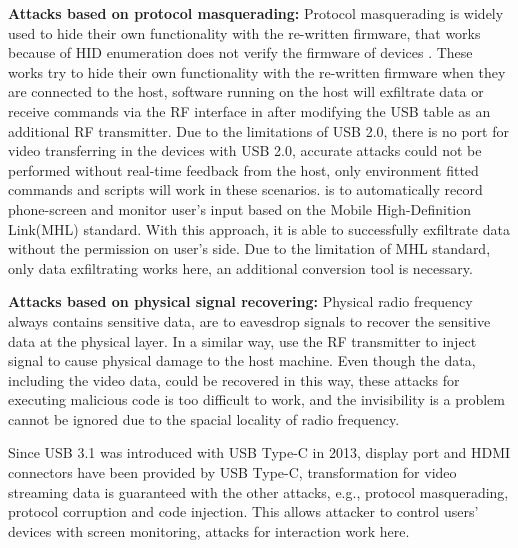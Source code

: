 \textbf{Attacks based on protocol masquerading:} Protocol masquerading is widely used to hide their own functionality with the re-written firmware, that works because of HID enumeration does not verify the firmware of devices \cite{rubber,badusb, rubberducky2020, usbbypassing, iseeyou, usbdriver}. These works try to hide their own functionality with the re-written firmware when they are connected to the host, software running on the host will exfiltrate data or receive commands via the RF interface in \cite{turnip} after modifying the USB table as an additional RF transmitter. Due to the limitations of USB 2.0, there is no port for video transferring in the devices with USB 2.0, accurate attacks could not be performed without real-time feedback from the host, only environment fitted commands and scripts will work in these scenarios. \cite{JFC} is to automatically record phone-screen and monitor user's input based on the Mobile High-Definition Link(MHL) standard. With this approach, it is able to successfully exfiltrate data without the permission on user's side. Due to the limitation of MHL standard, only data exfiltrating works here, an additional conversion tool is necessary. 

\textbf{Attacks based on physical signal recovering:} Physical radio frequency always contains sensitive data, \cite{smartphone, poweremi,revealing,su2017usb, usbgpslocator, bates2014leveraging, badusbhub, usbfinger, side, usbdriver} are to eavesdrop signals to recover the sensitive data at the physical layer. In a similar way, \cite{usbkiller, cable, usbee, turnip} use the RF transmitter to inject signal to cause physical damage to the host machine. Even though the data, including the video data, could be recovered in this way, these attacks for executing malicious code is too difficult to work, and the invisibility is a problem cannot be ignored due to the spacial locality of radio frequency. 

Since USB 3.1 was introduced with USB Type-C in 2013, display port and HDMI connectors have been provided by USB Type-C, transformation for video streaming data is guaranteed with the other attacks, e.g., protocol masquerading,  protocol corruption and code injection. This allows attacker to control users' devices with screen monitoring, attacks for interaction work here.



\\


